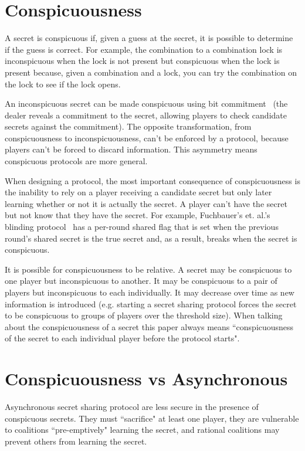 \documentclass[12pt]{dalcsthesis}
\begin{document}
\chapter{Conspicuousness}

A secret is conspicuous if, given a guess at the secret, it is possible to determine if the guess is correct. For example, the combination to a combination lock is inconspicuous when the lock is not present but conspicuous when the lock is present because, given a combination and a lock, you can try the combination on the lock to see if the lock opens.

An inconspicuous secret can be made conspicuous using bit commitment~\cite{Damg02, naor91} (the dealer reveals a commitment to the secret, allowing players to check candidate secrets against the commitment). The opposite transformation, from conspicuousness to inconspicuousness, can't be enforced by a protocol, because players can't be forced to discard information. This asymmetry means conspicuous protocols are more general.

When designing a protocol, the most important consequence of conspicuousness is the inability to rely on a player receiving a candidate secret but only later learning whether or not it is actually the secret. A player can't have the secret but not know that they have the secret. For example, Fuchbauer's et. al.'s blinding protocol~\cite{fuch10} has a per-round shared flag that is set when the previous round's shared secret is the true secret and, as a result, breaks when the secret is conspicuous.

It is possible for conspicuousness to be relative. A secret may be conspicuous to one player but inconspicuous to another. It may be conspicuous to a pair of players but inconspicuous to each individually. It may decrease over time as new information is introduced (e.g. starting a secret sharing protocol forces the secret to be conspicuous to groups of players over the threshold size). When talking about the conspicuousness of a secret this paper always means ``conspicuousness of the secret to each individual player before the protocol starts".

\chapter{Conspicuousness vs Asynchronous}
\label{Sec:AsympWeak}

Asynchronous secret sharing protocol are less secure in the presence of conspicuous secrets. They must ``sacrifice" at least one player, they are vulnerable to coalitions ``pre-emptively" learning the secret, and rational coalitions may prevent others from learning the secret.
\end{document}
